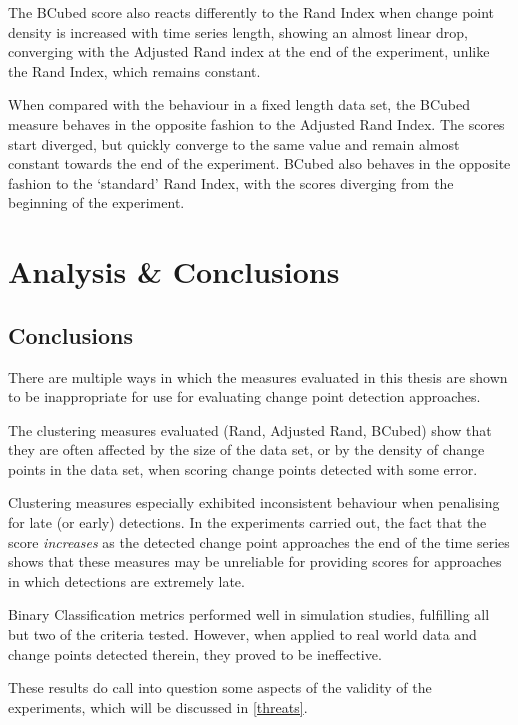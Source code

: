 \documentclass{uvamscse}	%
\begin{document}
The BCubed score also reacts differently to the Rand Index when change point density is increased with time series length, showing an almost linear drop, converging with the Adjusted Rand index at the end of the experiment, unlike the Rand Index, which remains constant.

When compared with the behaviour in a fixed length data set, the BCubed measure behaves in the opposite fashion to the Adjusted Rand Index. The scores start diverged, but quickly converge to the same value and remain almost constant towards the end of the experiment. BCubed also behaves in the opposite fashion to the `standard' Rand Index, with the scores diverging from the beginning of the experiment.


\chapter{Analysis \& Conclusions}
\label{conclusions}

\section{Conclusions}

There are multiple ways in which the measures evaluated in this thesis are shown to be inappropriate for use for evaluating change point detection approaches.

The clustering measures evaluated (Rand, Adjusted Rand, BCubed) show that they are often affected by the size of the data set, or by the density of change points in the data set, when scoring change points detected with some error.

Clustering measures especially exhibited inconsistent behaviour when penalising for late (or early) detections. In the experiments carried out, the fact that the score \emph{increases} as the detected change point approaches the end of the time series shows that these measures may be unreliable for providing scores for approaches in which detections are extremely late.

Binary Classification metrics performed well in simulation studies, fulfilling all but two of the criteria tested. However, when applied to real world data and change points detected therein, they proved to be ineffective.

These results do call into question some aspects of the validity of the experiments, which will be discussed in \autoref{threats}.
\end{document}
